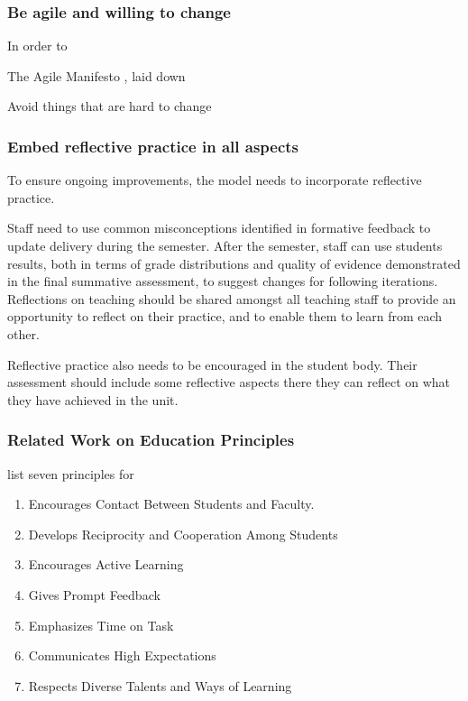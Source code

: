 \subsubsection{Be agile and willing to change} %
\label{ssub:be_agile_and_willing_to_change}

In order to 

The Agile Manifesto \cite{Beck:2001}, laid down 


Avoid things that are hard to change



\subsubsection{Embed reflective practice in all aspects} %
\label{ssub:embed_reflective_practice_in_all_aspects}

To ensure ongoing improvements, the model needs to incorporate reflective practice. 

Staff need to use common misconceptions identified in formative feedback to update delivery during the semester. After the semester, staff can use students results, both in terms of grade distributions and quality of evidence demonstrated in the final summative assessment, to suggest changes for following iterations. Reflections on teaching should be shared amongst all teaching staff to provide an opportunity to reflect on their practice, and to enable them to learn from each other.

Reflective practice also needs to be encouraged in the student body. Their assessment should include some reflective aspects there they can reflect on what they have achieved in the unit. 








\subsubsection{Related Work on Education Principles} %
\label{ssub:related_work_on_education_principles}

\citet{Chickering:1987} list seven principles for 
\begin{enumerate}
	\item Encourages Contact Between Students and Faculty.
	\item Develops Reciprocity and Cooperation Among Students
	\item Encourages Active Learning
	\item Gives Prompt Feedback
	\item Emphasizes Time on Task
	\item Communicates High Expectations
	\item Respects Diverse Talents and Ways of Learning
\end{enumerate}



